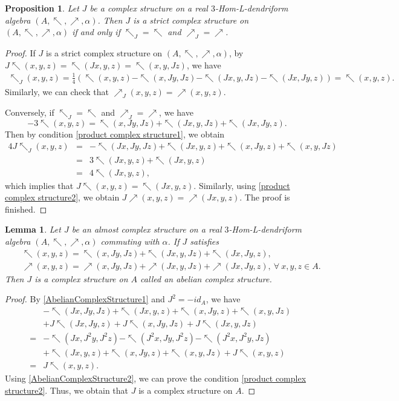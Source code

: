 \documentclass[a4paper,11pt]{article}
\def\a{\alpha}
\def\nw{\nwarrow}
\def\ne{\nearrow}
\newtheorem{lem}[thm]{Lemma}
\newtheorem{pro}[thm]{Proposition}
\theoremstyle{definition}
\begin{document}
\begin{pro}
Let $J$ be a complex structure  on a real $3$-Hom-L-dendriform algebra $(A,\nw,\ne,\alpha)$. Then $J$ is a strict complex structure on   $(A,\nw,\ne,\alpha)$  if and only if $\nw_J=\nw$ and $\ne_J=\ne$.
\end{pro}
\begin{proof} If $J$ is a strict complex structure on $(A,\nw,\ne,\alpha)$, by $J\nw(x,y,z)=\nw(Jx,y,z)=\nw(x,y,Jz)$, we have
\begin{eqnarray*}
\nw_J(x,y,z)=\frac{1}{4}(\nw(x,y,z)-\nw(x,Jy,Jz)-\nw(Jx,y,Jz)-\nw(Jx,Jy,z))=\nw(x,y,z).
\end{eqnarray*}
Similarly, we can check that $\ne_J(x,y,z)=\ne(x,y,z)$.

Conversely, if $\nw_J=\nw$ and $\ne_J=\ne$, we have
$$-3\nw(x,y,z)=\nw(x,Jy,Jz)+\nw(Jx,y,Jz)+\nw(Jx,Jy,z).$$
Then by  condition \eqref{product complex structure1}, we obtain
\begin{eqnarray*}
4J\nw_J(x,y,z)&=&-\nw(Jx,Jy,Jz)+\nw(Jx,y,z)+\nw(x,Jy,z)+\nw(x,y,Jz)\\
            &=&3\nw(Jx,y,z)+\nw(Jx,y,z)\\
            &=&4\nw(Jx,y,z),
\end{eqnarray*}
which implies that $J\nw(x,y,z)=\nw(Jx,y,z)$. Similarly, using \eqref{product complex structure2}, we obtain $J\ne(x,y,z)=\ne(Jx,y,z)$. The proof is finished.\end{proof}
\begin{lem}Let $J$ be an almost complex structure on a real $3$-Hom-L-dendriform algebra $(A,\nw,\ne,\alpha)$ commuting with $\a$.
      If $J$ satisfies
     \begin{eqnarray}\label{AbelianComplexStructure1}
&&\nw(x,y,z)=\nw(x,Jy,Jz)+\nw(Jx,y,Jz)+\nw(Jx,Jy,z),\\\label{AbelianComplexStructure2}&&\ne(x,y,z)=\ne(x,Jy,Jz)+\ne(Jx,y,Jz)+\ne(Jx,Jy,z),\ \forall \ x,y,z\in A.
\end{eqnarray}
Then $J$ is a complex structure on $A$ called an abelian  complex structure.
 \end{lem}
 \begin{proof}
   By \eqref{AbelianComplexStructure1} and $J^2=-id_A$, we have
\begin{eqnarray*}
&&-\nw(Jx,Jy,Jz)+\nw(Jx,y,z)+\nw(x,Jy,z)+\nw(x,y,Jz)\\
&&+J\nw(Jx,Jy,z)+J\nw(x,Jy,Jz)+J\nw(Jx,y,Jz)\\
&=&-\nw(Jx,J^2y,J^2z)-\nw(J^2x,Jy,J^2z)-\nw(J^2x,J^2y,Jz)\\
&&+\nw(Jx,y,z)+\nw(x,Jy,z)+\nw(x,y,Jz)+J\nw(x,y,z)\\
&=&J\nw(x,y,z).
\end{eqnarray*}
Using  \eqref{AbelianComplexStructure2}, we can prove the condition \eqref{product complex structure2}. Thus, we obtain that $J$ is a complex structure on $A$.
 \end{proof}
\end{document}

